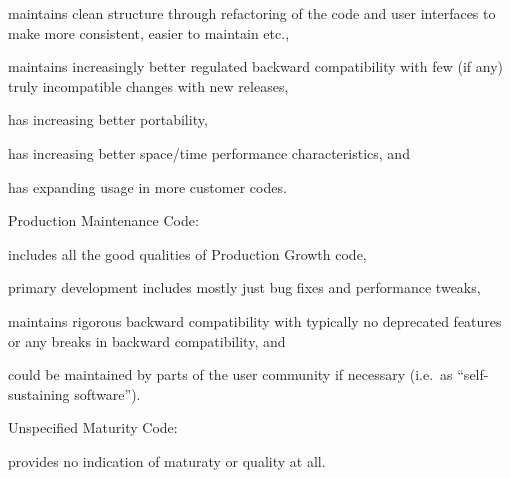 \documentclass[11pt]{SANDreport}
\begin{document}
\begin{compactenum}
\begin{compactitem}
{}\item maintains clean structure through refactoring of the code and
user interfaces to make more consistent, easier to maintain etc.,

{}\item maintains increasingly better regulated backward compatibility
with few (if any) truly incompatible changes with new releases,

{}\item has increasing better portability,

{}\item has increasing better space/time performance characteristics, and

{}\item has expanding usage in more customer codes.

\end{compactitem}

{}\item Production Maintenance Code:

\begin{compactitem}

{}\item includes all the good qualities of Production Growth code,

{}\item primary development includes mostly just bug fixes and
performance tweaks,

{}\item maintains rigorous backward compatibility with typically no
deprecated features or any breaks in backward compatibility, and

{}\item could be maintained by parts of the user community if
necessary (i.e.\ as ``self-sustaining software'').

\end{compactitem}

{}\item Unspecified Maturity Code:

\begin{compactitem}

{}\item provides no indication of maturaty or quality at all.

\end{compactitem}

\end{compactenum}
\end{document}
